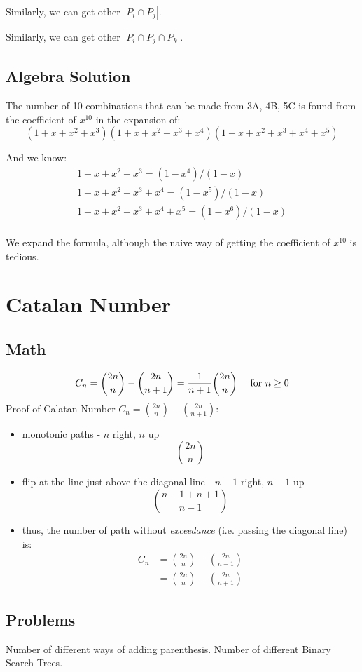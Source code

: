 Similarly, we can get other $|P_i \cap P_j|$.

Similarly, we can get other $|P_i \cap P_j \cap P_k|$.
\subsection{Algebra Solution}
The number of 10-combinations that can be made from 3A, 4B, 5C is found from the coefficient of $x^{10}$ in the expansion of:
$$
(1+x+x^2+x^3)(1+x+x^2+x^3+x^4)(1+x+x^2+x^3+x^4+x^5)
$$

And we know:
\begin{eqnarray*}
1+x+x^2+x^3         = (1-x^4)/(1-x)  \\
1+x+x^2+x^3+x^4     = (1-x^5)/(1-x)  \\
1+x+x^2+x^3+x^4+x^5 = (1-x^6)/(1-x)  \\
\end{eqnarray*}


We expand the formula, although the  naive way of getting the coefficient of $x^{10}$ is tedious. 

\section{Catalan Number}
\subsection{Math}
$$
C_n = {2n\choose n} - {2n\choose n+1} = {1\over n+1}{2n\choose n} \quad\text{ for }n\ge 0
$$
 Proof of Calatan Number $C_n ={2n\choose n} - {2n\choose n+1}$:
\begin{itemize}
\begin{figure}[]
    \centerline{\texttt{[image: catalan\_proof]}}
    \caption{Piazza}
  \label{fig:label}
\end{figure}
\item monotonic paths - $n$ right, $n$ up
$$
{2n\choose n}
$$
\item flip at the line just above the diagonal line - $n-1$ right, $n+1$ up
$$
{n-1+n+1\choose n-1}
$$
\item thus, the number of path without \textit{exceedance} (i.e. passing the diagonal line) is: 
\begin{align*}
C_n &= {2n\choose n} - {2n\choose n-1}\\ 
&={2n\choose n} - {2n\choose n+1}
\end{align*}
\end{itemize}

\subsection{Problems}
Number of different ways of adding parenthesis. 
Number of different Binary Search Trees.


